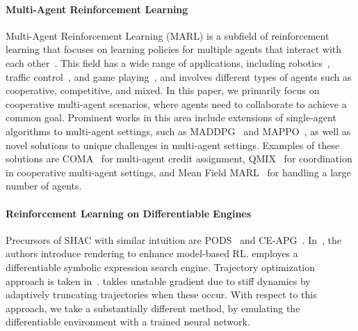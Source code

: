 \paragraph{Multi-Agent Reinforcement Learning}
Multi-Agent Reinforcement Learning (MARL) is a subfield of reinforcement learning that focuses on learning policies for multiple agents that interact with each other~\cite{albrecht2024multi}. 
This field has a wide range of applications, 
including robotics~\cite{DBLP:journals/air/ChungFYN24}, 
traffic control~\cite{DBLP:journals/tits/ChuWCL20}, 
and game playing~\cite{DBLP:conf/iclr/BakerKMWPMM20,jaderberg2019human}, 
and involves different types of agents such as cooperative, competitive, and mixed. 
In this paper, we primarily focus on cooperative multi-agent scenarios, 
where agents need to collaborate to achieve a common goal. 
Prominent works in this area include extensions of single-agent algorithms to multi-agent settings, 
such as MADDPG~\cite{DBLP:conf/nips/LoweWTHAM17} and MAPPO~\cite{DBLP:conf/nips/YuVVGWBW22}, 
as well as novel solutions to unique challenges in multi-agent settings. Examples of these solutions are COMA~\cite{DBLP:conf/aaai/FoersterFANW18} for multi-agent credit assignment, 
QMIX~\cite{DBLP:conf/icml/RashidSWFFW18} for coordination in cooperative multi-agent settings, 
and Mean Field MARL~\cite{DBLP:conf/icml/YangLLZZW18} for handling a large number of agents.

\paragraph{Reinforcement Learning on Differentiable Engines}
Precursors of SHAC with similar intuition are PODS~\cite{Mora21} and CE-APG~\cite{Gillen22}. In~\cite{Lv23}, the authors introduce rendering to enhance model-based RL. \cite{Zheng24} employes a differentiable symbolic expression search engine. Trajectory optimization approach is taken in~\cite{Wan24}. \cite{Georgiev24} takles unstable gradient due to stiff dynamics by adaptively truncating trajectories when these occur. With respect to this approach, we take a substantially different method, by emulating the differentiable environment with a trained neural network.

